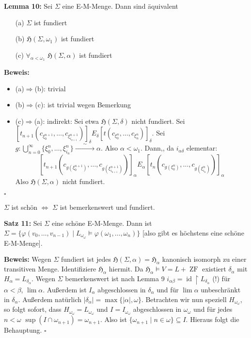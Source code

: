 \documentclass[a4paper,fontsize=11pt]{scrartcl}
\newcommand{\simrightarrow}{\xrightarrow{\phantom{\sim}\sim\phantom{\sim}}}
\newcommand{\ZF}{\operatorname{ZF}}
\newcommand{\id}{\operatorname{id}}
\begin{document}
{\bf Lemma 10:} Sei $\Sigma$ eine E-M-Menge. Dann sind äquivalent
\begin{itemize}
  \item[(a)] $\Sigma$ ist fundiert
  \item[(b)] $\mathfrak{H}(\Sigma,\omega_1)$ ist fundiert
  \item[(c)] $\forall_{\alpha<\omega_1}$ $\mathfrak{H}(\Sigma,\alpha)$ ist fundiert
\end{itemize}
{\bf Beweis:}
\begin{itemize}
  \item (a)$\Rightarrow$(b): trivial
  \item (b)$\Rightarrow$(c): ist trivial wegen Bemerkung
  \item (c)$\Rightarrow$(a): indirekt: Sei etwa
    $\mathfrak{H}(\Sigma,\delta)$ nicht fundiert. Sei
    $[t_{n+1}(c_{\xi_0^{n+1}},\ldots,c_{\xi_{i_{n+1}}^{n+1}})]_\delta
    E_\delta [t(c_{\xi_0^n},\ldots,c_{\xi_n^n})]_\delta$. Sei $g :
    \bigcup\limits_{n=0}^{\infty}\{\xi_0^n,\ldots,\xi_{i_n}^n\}\simrightarrow\alpha$. Also
    $\alpha<\omega_1$. Dann,, da $i_{\alpha\delta}$ elementar:
    $$ [t_{n+1}(c_{g(\xi_0^{n+1})},\ldots,c_{g(\xi_{i_{n+1}}^{n+1})})]_\alpha E_\alpha [t_n(c_{g(\xi_0^n)},\ldots,c_{g(\xi_{i_n}^n)})]_\alpha $$
    Also $\mathfrak{H}(\Sigma,\alpha)$ nicht fundiert.
\end{itemize}
\hfill $\square$

$\Sigma$ ist schön $\Leftrightarrow$ $\Sigma$ ist bemerkenswert und
fundiert.

{\bf Satz 11:} Sei $\Sigma$ eine schöne E-M-Menge. Dann ist
$\Sigma=\{\varphi(v_0,\ldots,v_{n-1}) \mid
L_{\omega_\omega}\models\varphi(\omega_1,\ldots,\omega_n)\}$ [also
  gibt es höchstens eine schöne E-M-Menge].

{\bf Beweis:} Wegen $\Sigma$ fundiert ist jedes
$\mathfrak{H}(\Sigma,\alpha)=\mathfrak{H}_\alpha$ kanonisch isomorph
zu einer transitiven Menge. Identifiziere $\mathfrak{H}_\alpha$
hiermit. Da $\mathfrak{H}_\alpha\models V=L + \ZF$ existiert
$\delta_\alpha$ mit $H_\alpha=L_{\delta_\alpha}$. Wegen $\Sigma$
bemerkenswert ist nach Lemma 9 $i_{\alpha\beta}=\id\upharpoonright
L_{\delta_\alpha}$ (!) für $\alpha<\beta$, $\lim \alpha$. Außerdem ist
$I_\alpha$ abgeschlossen in $\delta_\alpha$ und für $\lim \alpha$
unbeschränkt in $\delta_\alpha$. Außerdem natürlich
$|\delta_\alpha|=\max\{|\alpha|,\omega\}$. Betrachten wir nun speziell
$H_{\omega_\omega}$, so folgt sofort, dass
$H_{\omega_\omega}=L_{\omega_\omega}$ und $I=I_{\omega_\omega}$
abgeschlossen in $\omega_\omega$ und für jedes $n<\omega$
$\sup(I\cap\omega_{n+1})=\omega_{n+1}$. Also ist
$\{\omega_{n+1}\mid n\in\omega\}\subseteq I$. Hieraus folgt die
Behauptung.
\hfill $\square$
\end{document}
